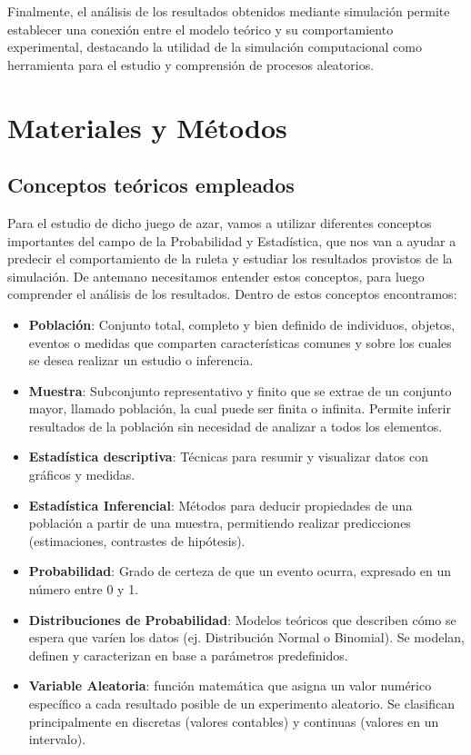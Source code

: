 \documentclass{article}
\begin{document}
Finalmente, el análisis de los resultados obtenidos mediante simulación permite establecer una conexión entre el modelo teórico y su comportamiento experimental, destacando la utilidad de la simulación computacional como herramienta para el estudio y comprensión de procesos aleatorios.

\newpage

\section{Materiales y Métodos}

\subsection{Conceptos teóricos empleados}

Para el estudio de dicho juego de azar, vamos a utilizar diferentes conceptos importantes del campo de la Probabilidad y Estadística, que nos van a ayudar a predecir el comportamiento de la ruleta y estudiar los resultados provistos de la simulación.
De antemano necesitamos entender estos conceptos, para luego comprender el análisis de los resultados. Dentro de estos conceptos encontramos: 
\begin{itemize}
    \item \textbf{Población}: Conjunto total, completo y bien definido de individuos, objetos, eventos o medidas que comparten características comunes y sobre los cuales se desea realizar un estudio o inferencia.
    
    \item \textbf{Muestra}: Subconjunto representativo y finito que se extrae de un conjunto mayor, llamado población, la cual puede ser finita o infinita. Permite inferir resultados de la población sin necesidad de analizar a todos los elementos.
    
    \item \textbf{Estadística descriptiva}: Técnicas para resumir y visualizar datos con gráficos y medidas.
    
    \item  \textbf{Estadística Inferencial}: Métodos para deducir propiedades de una población a partir de una 
    muestra, permitiendo realizar predicciones (estimaciones, contrastes de hipótesis). 
    \item \textbf{Probabilidad}: Grado de certeza de que un evento ocurra, expresado en un número entre 0 y 1. 
    
    \item \textbf{Distribuciones de Probabilidad}: Modelos teóricos que describen cómo se espera que varíen los datos 
    (ej. Distribución Normal o Binomial).  Se modelan, definen y caracterizan en base a parámetros predefinidos. 
    
    \item \textbf{Variable Aleatoria}: función matemática que asigna un valor numérico específico a cada resultado posible de un experimento aleatorio. Se clasifican principalmente en discretas (valores contables) y continuas (valores en un intervalo). 
    

\end{itemize}
\end{document}
